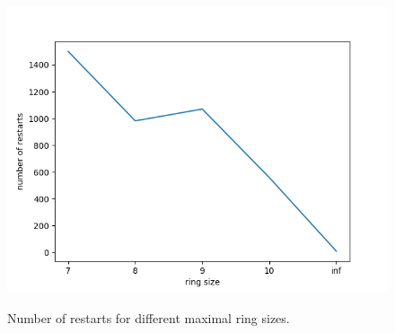 \begin{figure}[h]
	\begin{centering}
		{\includegraphics[scale=0.6]{figures/approach/restarts.png}}
		\caption[Number of restarts]{Number of restarts for different maximal ring sizes.}
		\label{fig:restarts}
	\end{centering}
\end{figure}
